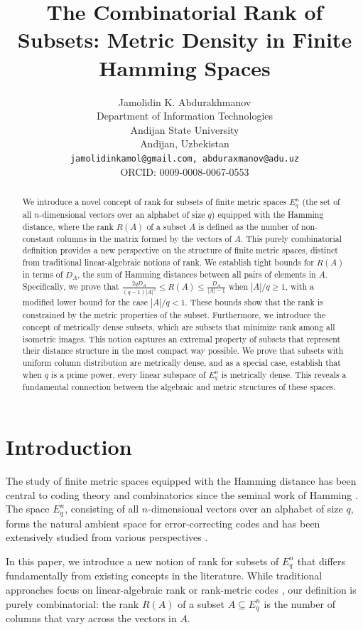 \documentclass[12pt]{article}
\title{The Combinatorial Rank of Subsets: Metric Density in Finite Hamming Spaces}
\author{Jamolidin K. Abdurakhmanov\\
Department of Information Technologies\\
Andijan State University\\
Andijan, Uzbekistan\\
\texttt{jamolidinkamol@gmail.com, abduraxmanov@adu.uz}\\
ORCID: 0009-0008-0067-0553}
\date{}
\newcommand{\Eqn}{E_q^n}
\renewcommand{\geq}{\geqslant}
\renewcommand{\leq}{\leqslant}
\begin{document}
\maketitle

\begin{abstract}
We introduce a novel concept of rank for subsets of finite metric spaces $\Eqn$ (the set of all $n$-dimensional vectors over an alphabet of size $q$) equipped with the Hamming distance, where the rank $R(A)$ of a subset $A$ is defined as the number of non-constant columns in the matrix formed by the vectors of $A$. This purely combinatorial definition provides a new perspective on the structure of finite metric spaces, distinct from traditional linear-algebraic notions of rank. We establish tight bounds for $R(A)$ in terms of $D_A$, the sum of Hamming distances between all pairs of elements in $A$. Specifically, we prove that $\frac{2qD_A}{(q-1)|A|^2} \leq R(A) \leq \frac{D_A}{|A|-1}$ when $|A|/q \geq 1$, with a modified lower bound for the case $|A|/q < 1$. These bounds show that the rank is constrained by the metric properties of the subset. Furthermore, we introduce the concept of metrically dense subsets, which are subsets that minimize rank among all isometric images. This notion captures an extremal property of subsets that represent their distance structure in the most compact way possible. We prove that subsets with uniform column distribution are metrically dense, and as a special case, establish that when $q$ is a prime power, every linear subspace of $\Eqn$ is metrically dense. This reveals a fundamental connection between the algebraic and metric structures of these spaces.
\end{abstract}

\section{Introduction}
\label{sec:intro}

The study of finite metric spaces equipped with the Hamming distance has been central to coding theory and combinatorics since the seminal work of Hamming \cite{hamming1950error}. The space $\Eqn$, consisting of all $n$-dimensional vectors over an alphabet of size $q$, forms the natural ambient space for error-correcting codes and has been extensively studied from various perspectives \cite{macwilliams1977theory,vanLint1999introduction}.

In this paper, we introduce a new notion of rank for subsets of $\Eqn$ that differs fundamentally from existing concepts in the literature. While traditional approaches focus on linear-algebraic rank or rank-metric codes \cite{gabidulin1985theory}, our definition is purely combinatorial: the rank $R(A)$ of a subset $A \subseteq \Eqn$ is the number of columns that vary across the vectors in $A$.
\end{document}
